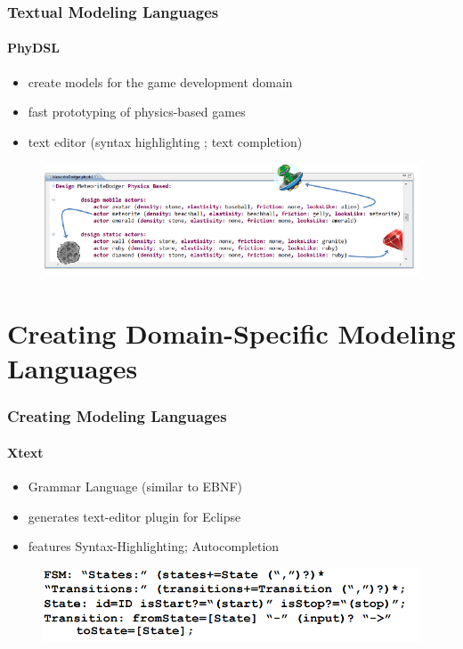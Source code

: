 \documentclass[11 pt,t]{beamer}
\begin{document}
\begin{frame}
\vspace{.5cm}
  \frametitle{Textual Modeling Languages}
  \framesubtitle{PhyDSL}
  \begin{itemize}
   \item create models for the game development domain
   \item fast prototyping of physics-based games
   \item text editor (syntax highlighting ; text completion)
  \end{itemize}

  \begin{figure}[hbtp]
      \centering
      \includegraphics[width=\textwidth]{images/PhyDSL1.PNG}
    \end{figure}
\end{frame}

\section{Creating Domain-Specific Modeling Languages}
\begin{frame}
\vspace{.5cm}
  \frametitle{Creating Modeling Languages}
  \framesubtitle{Xtext}
  \begin{itemize}
    \item Grammar Language (similar to EBNF)
    \item generates text-editor plugin for Eclipse
    \item features Syntax-Highlighting; Autocompletion
  \end{itemize}
  \begin{figure}[hbtp]
      \centering
      \includegraphics[width=\textwidth]{images/XTextGrammar.PNG}
    \end{figure}
\end{frame}
\end{document}
